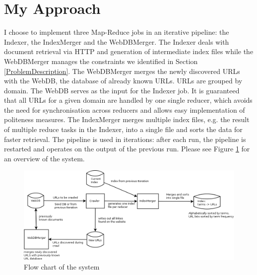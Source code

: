 \documentclass[10pt,a4paper]{report}
\begin{document}
\section*{My Approach}
I choose to implement three Map-Reduce jobs in an iterative pipeline: the Indexer, the IndexMerger and the WebDBMerger. The Indexer
deals with document retrieval via HTTP and generation of intermediate index files while the WebDBMerger
manages the constraints we identified in Section \ref{ProblemDescription}. The WebDBMerger merges the newly discovered URLs
with the WebDB, the database of already known URLs. URLs are grouped by domain. The WebDB serves as the input for the
Indexer job. It is guaranteed that all URLs for a given domain are handled by one single reducer, which avoids the need
for synchronisation across reducers and allows easy implementation of politeness measures.
The IndexMerger merges multiple index files, e.g. the result
of multiple reduce tasks in the Indexer, into a single file and sorts the data for faster retrieval.
The pipeline is used in iterations: after each run, the pipeline is restarted and operates on the output of the previous run. Please
see Figure \ref{FlowChart} for an overview of the system.
\begin{figure}
\includegraphics[width=1.2\textwidth]{flowchart.png} 
\caption{Flow chart of the system}
\label{FlowChart} 
\end{figure}
\end{document}
